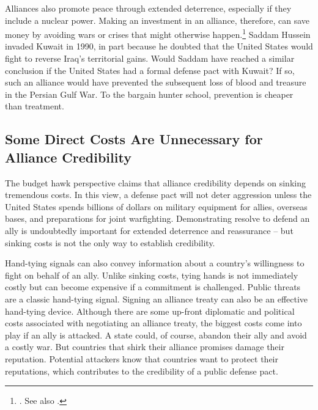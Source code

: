 Alliances also promote peace through extended deterrence, especially if they include a nuclear power.\autocite{Leeds2003,FuhrmannSechser2014} Making an investment in an alliance, therefore, can save money by avoiding wars or crises that might otherwise happen.\footnote{\cite[18]{BrandsFeaver2017}. See also \cite[37]{colbyTNI16}.} Saddam Hussein invaded Kuwait in 1990, in part because he doubted that the United States would fight to reverse Iraq's territorial gains. Would Saddam have reached a similar conclusion if the United States had a formal defense pact with Kuwait? If so, such an alliance would have prevented the subsequent loss of blood and treasure in the Persian Gulf War. To the bargain hunter school, prevention is cheaper than treatment. 

\subsection*{Some Direct Costs Are Unnecessary for Alliance Credibility}

The budget hawk perspective claims that alliance credibility depends on sinking tremendous costs. In this view, a defense pact will not deter aggression unless the United States spends billions of dollars on military equipment for allies, overseas bases, and preparations for joint warfighting. Demonstrating resolve to defend an ally is undoubtedly important for extended deterrence and reassurance -- but sinking costs is not the only way to establish credibility.

Hand-tying signals can also convey information about a country's willingness to fight on behalf of an ally.\autocite[On the difference between hand-tying and sunk costs, see][]{Fearon1997} Unlike sinking costs, tying hands is not immediately costly but can become expensive if a commitment is challenged. Public threats are a classic hand-tying signal.\autocite[See, for example,][]{schultzdemocracy01}
Signing an alliance treaty can also be an effective hand-tying device. Although there are some up-front diplomatic and political costs associated with negotiating an alliance treaty, the biggest costs come into play if an ally is attacked. A state could, of course, abandon their ally and avoid a costly war. But countries that shirk their alliance promises damage their reputation.\autocite{giblerJCR08,crescenziISQ12} Potential attackers know that countries want to protect their reputations, which contributes to the credibility of a public defense pact.

